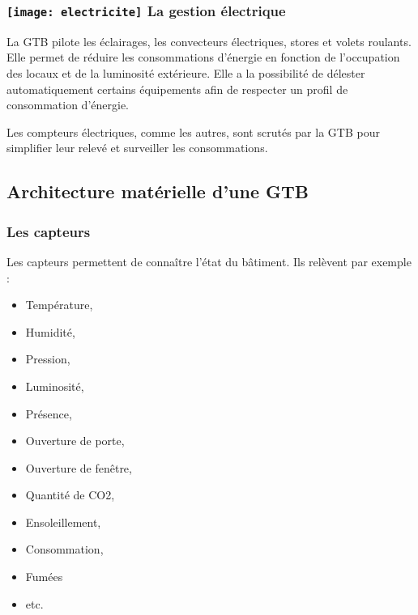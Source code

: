 \subsubsection{\texttt{[image: electricite]} La gestion électrique}
La GTB pilote les éclairages, les convecteurs électriques, stores et volets roulants. Elle permet de réduire les consommations d'énergie en fonction de l'occupation des locaux et de la luminosité extérieure. Elle a la possibilité de délester automatiquement certains équipements afin de respecter un profil de consommation d'énergie.

Les compteurs électriques, comme les autres, sont scrutés par la GTB pour simplifier leur relevé et surveiller les consommations.

\subsection{Architecture matérielle d'une GTB}

\begin{UPSTIactivite}
	\UPSTIeleveOnly{\vspace{6cm}}
\end{UPSTIactivite}

\subsubsection*{Les capteurs}
Les capteurs permettent de connaître l'état du bâtiment. Ils relèvent par exemple :
\begin{multicols}{3}
	\begin{itemize}
		\item Température,
		\item Humidité,
		\item Pression,
		\item Luminosité,
		\item Présence,
		\item Ouverture de porte,
		\item Ouverture de fenêtre,
		\item Quantité de CO2,
		\item Ensoleillement,
		\item Consommation,
		\item Fumées
		\item etc.
	\end{itemize}
\end{multicols}

